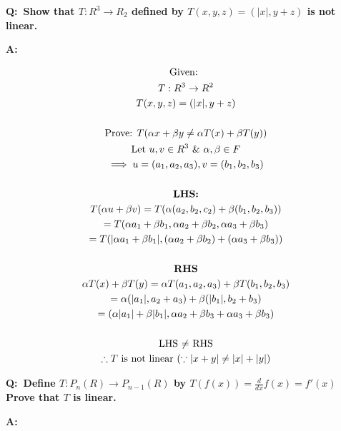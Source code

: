 \documentclass[english,course,fleqn]{lecture}
\newenvironment{qanda}{\setlength{\parindent}{0pt}}{\bigskip}
\newcommand{\Q}{\bigskip\bfseries Q:\ }
\newcommand{\A}{\par\textbf{A:} \normalfont}
\begin{document}
\begin{qanda}
	\Q Show that $T:R^{3} \rightarrow R_{2}$ defined by $T(x,y,z) = (|x|,y+z)$ is not linear.


  \A 

  \begin{gather*}
    \text{Given: }\\
    T: R^{3} \rightarrow R^{2}\\
    T(x,y,z) = (|x|, y + z)\\
    \\
    \text{Prove: $T(\alpha x + \beta y \ne \alpha T(x) + \beta T(y))$}\\
    \text{Let } u,v \in R^{3} ~\&~ \alpha, \beta \in F\\
    \implies u = (a_{1}, a_{2}, a_{3}), v = (b_{1}, b_{2}, b_{3})\\
    \\
    \text{\textbf{LHS:}}\\
    T(\alpha u + \beta v) = T(\alpha(a_{2}, b_{2}, c_{2}) + \beta (b_{1}, b_{2}, b_{3}))\\
    =T(\alpha a_{1} + \beta b_{1}, \alpha a_{2} + \beta b_{2}, \alpha a_{3} + \beta b_{3})\\
    = T(|\alpha a_{1} + \beta b_{1}|, (\alpha a_{2} + \beta b_{2}) + (\alpha a_{3} + \beta b_{3}))\\
    \\
    \text{\textbf{RHS}}\\
    \alpha T(x) + \beta T(y) = \alpha T(a_{1}, a_{2}, a_{3}) + \beta T(b_{1}, b_{2}, b_{3})\\
  = \alpha(|a_{1}| , a_{2} + a_{3}) + \beta (|b_{1}|, b_{2} + b_{3})\\
  = (\alpha | a_{1}| + \beta |b_{1}|, \alpha a_{2} + \beta b_{3} + \alpha a_{3} + \beta b_{3})\\
  \\
  \text{LHS $\ne$ RHS}\\
  \therefore \text{$T$ is not linear } ( \because |x + y| \ne |x| + |y| )
  \end{gather*}

  \Q Define $T:P_{n}(R) \rightarrow P_{n-1}(R)$ by $T(f(x)) = \frac{d}{dx}{f(x)} = f'(x)$
  Prove that $T$ is linear.

  \A


\end{qanda}
\end{document}
